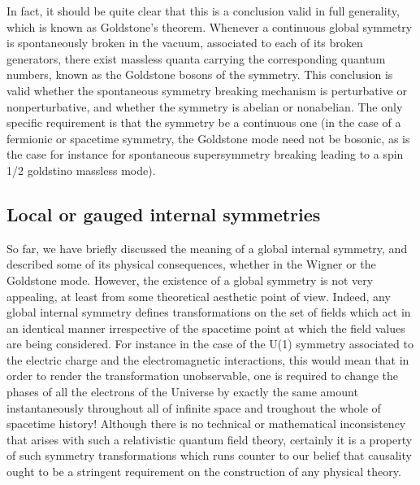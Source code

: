 \documentclass[a4paper,11pt]{article}
\begin{document}
In fact, it should be quite clear that this is a conclusion valid in full
generality, which is known as Goldstone's theorem. Whenever a continuous
global symmetry is spontaneously broken in the vacuum, associated to each
of its broken generators, there exist massless quanta carrying the
cor\-res\-pon\-ding quantum numbers, known as the Goldstone bosons of the
symmetry. This conclusion is valid whether the spontaneous symmetry
breaking mechanism is perturbative or nonperturbative, and whether the
symmetry is abelian or nonabelian. The only specific requirement is that
the symmetry be a con\-ti\-nuous one (in the case of a fermionic or spacetime
symmetry, the Goldstone mode need not be bosonic, as is the case for instance
for spontaneous supersymmetry breaking leading to a spin 1/2 goldstino
massless mode).

\subsection{Local or gauged internal symmetries}
\label{Subsect4.3}

So far, we have briefly discussed the meaning of a global internal
symmetry, and described some of its physical consequences, whether
in the Wigner or the Goldstone mode. However, the
existence of a global symmetry is not very appealing, at least from
some theoretical aesthetic point of view. Indeed, any global internal
symmetry defines transformations on the set of fields which act
in an identical manner irrespective of the spacetime point at which the field
values are being considered. For instance in the case of the U(1) symmetry
associated to the electric charge and the electromagnetic interactions,
this would mean that in order to render the transformation unobservable,
one is required to change the phases of all the electrons of the Universe
by exactly the same amount instantaneously throughout all of infinite
space and troughout the whole of spacetime history! Although there is
no technical or mathematical inconsistency that arises with such a
relativistic quantum field theory, certainly it is a property of such
symmetry transformations which runs counter to our belief that causality
ought to be a stringent requirement on the construction of any physical
theory.
\end{document}
